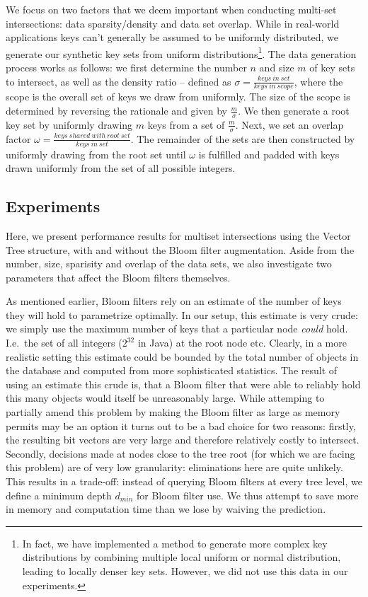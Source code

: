 \documentclass[11pt,letterpaper]{article}
\begin{document}
We focus on two factors that we deem important when conducting
multi-set intersections: data sparsity/density and data set
overlap. While in real-world applications keys can't generally be
assumed to be uniformly distributed, we generate our synthetic key
sets from uniform distributions\footnote{In fact, we have implemented
  a method to generate more complex key distributions by combining
  multiple local uniform or normal distribution, leading to locally
  denser key sets. However, we did not use this data in our
  experiments.}. The data generation process works as follows: we
first determine the number $n$ and size $m$ of key sets to intersect,
as well as the density ratio -- defined as $\sigma =
\frac{\mathit{keys~in~set}}{\mathit{keys~in~scope}}$, where the scope
is the overall set of keys we draw from uniformly. The size of the
scope is determined by reversing the rationale and given by
$\frac{m}{\sigma}$. We then generate a root key set by uniformly
drawing $m$ keys from a set of $\frac{m}{\sigma}$. Next, we set an
overlap factor $\omega =
\frac{\mathit{keys~shared~with~root~set}}{\mathit{keys~in~set}}$. The
remainder of the sets are then constructed by uniformly drawing from
the root set until $\omega$ is fulfilled and padded with keys drawn
uniformly from the set of all possible integers.

\subsection{Experiments}

Here, we present performance results for multiset intersections using
the Vector Tree structure, with and without the Bloom filter
augmentation. Aside from the number, size, sparisity and overlap of
the data sets, we also investigate two parameters that affect the
Bloom filters themselves. 

As mentioned earlier, Bloom filters rely on an estimate of the number
of keys they will hold to parametrize optimally. In our setup, this
estimate is very crude: we simply use the maximum number of keys that
a particular node \emph{could} hold. I.e.\ the set of all integers
($2^{32}$ in Java) at the root node etc. Clearly, in a more realistic
setting this estimate could be bounded by the total number of objects
in the database and computed from more sophisticated statistics. The
result of using an estimate this crude is, that a Bloom filter that
were able to reliably hold this many objects would itself be
unreasonably large. While attemping to partially amend this problem by
making the Bloom filter as large as memory permits may be an option it
turns out to be a bad choice for two reasons: firstly, the resulting
bit vectors are very large and therefore relatively costly to
intersect. Secondly, decisions made at nodes close to the tree root
(for which we are facing this problem) are of very low granularity:
eliminations here are quite unlikely. This results in a trade-off:
instead of querying Bloom filters at every tree level, we define a
minimum depth $d_{\mathit{min}}$ for Bloom filter use. We thus attempt
to save more in memory and computation time than we lose by waiving
the prediction.
\end{document}
